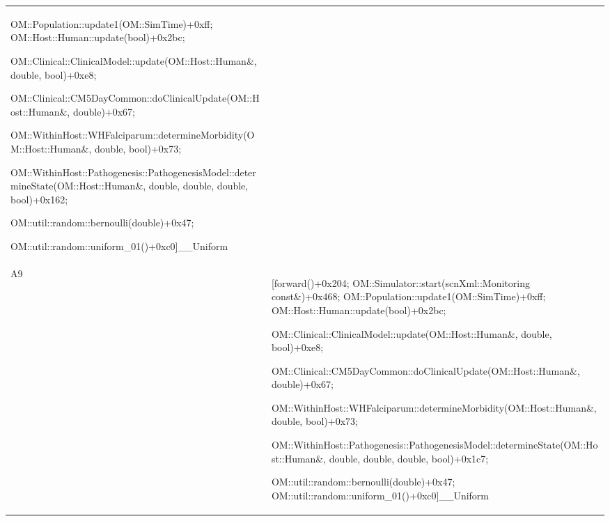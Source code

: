 \documentclass{article}
\begin{document}
\begin{table}[b!]
\begin{tabularx}{\textwidth}{@{}lX@{}}
	OM::Population::update1(OM::SimTime)+0xff; OM::Host::Human::update(bool)+0x2bc;

	OM::Clinical::ClinicalModel::update(OM::Host::Human\&, double, bool)+0xe8;

	OM::Clinical::CM5DayCommon::doClinicalUpdate(OM::Host::Human\&, double)+0x67;

	OM::WithinHost::WHFalciparum::determineMorbidity(OM::Host::Human\&, double, bool)+0x73;

	OM::WithinHost::Pathogenesis::PathogenesisModel::determineState(OM::Host::Human\&, double, double, double, bool)+0x162;

	OM::util::random::bernoulli(double)+0x47;

	OM::util::random::uniform\_01()+0xc0]\_\_Uniform\\
A9 & [forward()+0x204; OM::Simulator::start(scnXml::Monitoring const\&)+0x468;
 OM::Population::update1(OM::SimTime)+0xff; OM::Host::Human::update(bool)+0x2bc;

 OM::Clinical::ClinicalModel::update(OM::Host::Human\&, double, bool)+0xe8;

  OM::Clinical::CM5DayCommon::doClinicalUpdate(OM::Host::Human\&, double)+0x67;

  OM::WithinHost::WHFalciparum::determineMorbidity(OM::Host::Human\&, double, bool)+0x73;

  OM::WithinHost::Pathogenesis::PathogenesisModel::determineState(OM::Host::Human\&, double, double, double, bool)+0x1c7;

  OM::util::random::bernoulli(double)+0x47; OM::util::random::uniform\_01()+0xc0]\_\_Uniform\\
\bottomrule
  \end{tabularx}
  \end{table}
\end{document}
